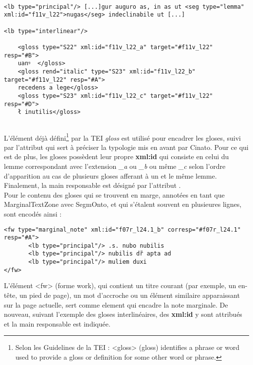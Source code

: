 \documentclass[a4paper, twoside, 12pt]{book}
\begin{document}
\begin{verbatim}

<lb type="principal"/> [...]gur auguro as, in as ut <seg type="lemma" xml:id="f11v_l22">nugas</seg> indeclinabile ut [...] 

<lb type="interlinear"/> 

    <gloss type="S22" xml:id="f11v_l22_a" target="#f11v_l22" resp="#B">
    uanꝰ  </gloss> 
    <gloss rend="italic" type="S23" xml:id="f11v_l22_b" target="#f11v_l22" resp="#A">
    recedens a lege</gloss> 
    <gloss type="S23" xml:id="f11v_l22_c" target="#f11v_l22" resp="#D">
    ł inutilis</gloss> 
    
\end{verbatim}


L'élément déjà défini\footnote{ Selon les Guidelines de la TEI : <gloss> (gloss) identifies a phrase or word used to provide a gloss or definition for some other word or phrase.} par la TEI \textit{gloss} est utilisé pour encadrer les gloses, suivi par l'attribut \@type qui sert à préciser la typologie mis en avant par Cinato. Pour ce qui est de plus, les gloses possèdent leur propre \textbf{xml:id} qui consiste en celui du lemme correspondant avec l'extension \textit{\_a} ou \textit{\_b} ou même \textit{\_c} selon l'ordre d'apparition au cas de plusieurs gloses afferant à un et le même lemme. Finalement, la main responsable est désigné par l'attribut \@resp. \\


Pour le contenu des gloses qui se trouvent en marge, annotées en tant que MarginalTextZone avec SegmOnto, et qui s'étalent souvent en plusieures lignes, sont encodés ainsi :

\begin{verbatim} 
<fw type="marginal_note" xml:id="f07r_l24.1_b" corresp="#f07r_l24.1" resp="#A">
       <lb type="principal"/> .s. nubo nubilis
       <lb type="principal"/> nubilis dr̃ apta ad
       <lb type="principal"/> muliem duxi 
</fw>
\end{verbatim}

L'élément <fw> (forme work), qui contient un titre courant (par exemple, un en-tête, un pied de page), un mot d'accroche ou un élément similaire apparaissant sur la page actuelle, sert comme element qui encadre la note marginale. De nouveau, suivant l'exemple des gloses interlinéaires, des \textbf{xml:id} y sont attribués et la main responsable est indiquée.\\
\end{document}

